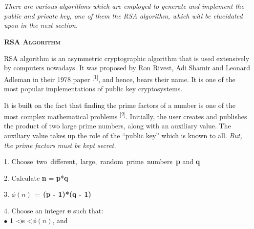 \documentclass[12 pt]{article}
\begin{document}
\emph{\\\\There are various algorithms which are employed to generate and implement the public and private key, one of them the RSA algorithm, which will be elucidated upon in the next section.}

\pagebreak
\begin{LARGE}	
\begin{center}
\textbf{\textsc{RSA Algorithm}}
\end{center}
\end{LARGE}

\noindent RSA algorithm is an asymmetric cryptographic algorithm that is used extensively by computers nowadays. It was proposed by Ron Rivest, Adi Shamir and Leonard Adleman in their 1978 paper \textsuperscript{[1]}, and hence, bears their name. It is one of the most popular implementations of public key cryptosystems.\bigskip

\noindent It is built on the fact that finding the prime factors of a number is one of the most complex mathematical problems \textsuperscript{[2]}. Initially, the user creates and publishes the product of two large prime numbers, along with an auxiliary value. The auxiliary value takes up the role of the ``public key'' which is known to all. \emph{But, the prime factors must be kept secret.}\bigskip

1. Choose\ two\ different,\ large,\ random\  prime\  numbers\ \textbf{p} and \textbf{q}

2. Calculate \textbf{n} = \textbf{p}*\textbf{q}

3. \textbf{\boldmath $\phi(n)$ = (p - 1)*(q - 1)}

4. Choose an integer \textbf{e} such that:\\[3 pt]

\hspace{16.18 pt} $\bullet$ \textbf{1} \textless \textbf{e} \textless \boldmath $\phi(n)$, and
\end{document}
